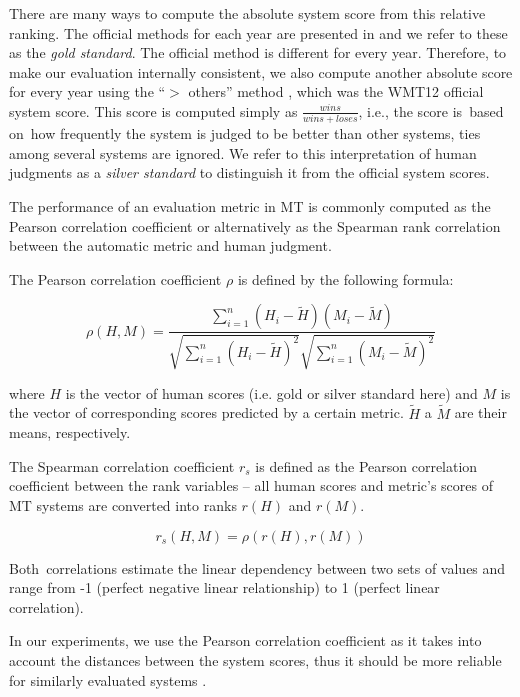 There are many ways to compute the absolute system score from this relative
ranking. The official methods for each year are presented in  
and we refer to these as the \textit{gold standard}. The official method is
different for every year. Therefore, to make our evaluation internally 
consistent, we also compute another absolute score for every year using the 
“$ >$ others” method \citep{bojar-grains}, which was the WMT12 official system
score. This score is computed simply as $\frac{wins}{wins+loses} $, i.e., the 
score is~based on~how frequently the system is judged to be better than 
other systems, ties among several systems are ignored. We refer to this 
interpretation of human judgments as a \textit{silver standard} to distinguish
it from the official system scores. %

The performance of an evaluation metric in MT is commonly computed as the
Pearson correlation coefficient or alternatively as the Spearman rank 
correlation between the automatic metric and human judgment. 

The Pearson correlation coefficient $\rho$ is defined by the following formula:

\begin{equation*}
\rho(H,M) = \frac{ \sum_{i=1}^{n}{(H_i - \tilde{H})(M_i - \tilde{M})}}{ \sqrt{ \sum_{i=1}^{n}{(H_i - \tilde{H})^2} }  \sqrt{ \sum_{i=1}^{n}{(M_i - \tilde{M})^2} } } 
\end{equation*}

where $H$ is the vector of human scores (i.e. gold or silver standard here) and 
$M$ is the vector of corresponding scores predicted by a certain metric. 
$\tilde{H}$ a $\tilde{M}$ are their means, respectively. 

The Spearman correlation coefficient $r_{s} $ is defined as the Pearson 
correlation coefficient between the rank variables -- all human scores and  
metric’s scores of MT systems are converted into ranks $r(H)$ and $r(M)$.

\begin{equation*}
r_{s}(H,M) = \rho(r(H),r(M))
\end{equation*}

Both~correlations estimate the linear dependency between two sets of values and 
range from -1 (perfect negative linear relationship) to 1 (perfect linear correlation). 

In our experiments, we use the Pearson correlation coefficient as it takes into 
account the distances between the system scores, thus it should be more 
reliable for similarly evaluated systems \citep{machacek-bojar-2014-results}. 

